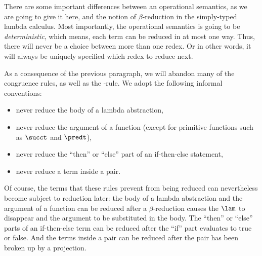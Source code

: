 \documentclass[12pt]{article}
\begin{document}
There are some important differences between an operational semantics,
as we are going to give it here, and the notion of $\beta$-reduction
in the simply-typed lambda calculus. Most importantly, the operational
semantics is going to be {\em deterministic}, which means, each
term can be reduced in at most one way. Thus, there will never be a
choice between more than one redex. Or in other words, it will always
be uniquely specified which redex to reduce next.

As a consequence of the previous paragraph, we will abandon many of
the congruence rules, as well as the {\nrule{\xi}}-rule. We adopt the
following informal conventions:
\begin{itemize}
\item never reduce the body of a lambda abstraction,
\item never reduce the argument of a function (except for primitive
  functions such as $\succt$ and $\predt$),
\item never reduce the ``then'' or ``else'' part of an if-then-else
  statement,
\item never reduce a term inside a pair.
\end{itemize}

Of course, the terms that these rules prevent from being reduced can
nevertheless become subject to reduction later: the body of a lambda
abstraction and the argument of a function can be reduced after a
$\beta$-reduction causes the $\lam$ to disappear and the argument
to be substituted in the body. The ``then'' or ``else'' parts of an
if-then-else term can be reduced after the ``if'' part evaluates to
true or false. And the terms inside a pair can be reduced after the
pair has been broken up by a projection.
\end{document}
